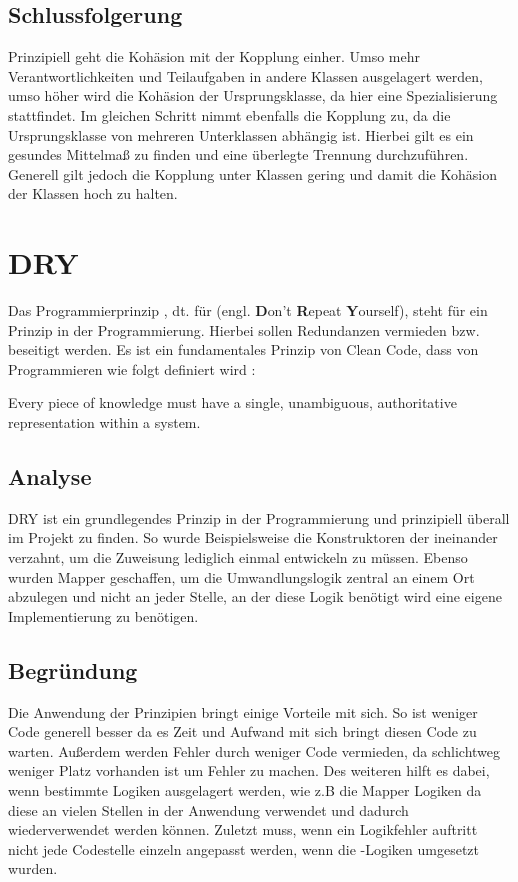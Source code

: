 		\subsection{Schlussfolgerung}
		Prinzipiell geht die Kohäsion mit der Kopplung einher. Umso mehr Verantwortlichkeiten und Teilaufgaben in andere Klassen ausgelagert werden, umso höher wird die Kohäsion der Ursprungsklasse, da hier eine Spezialisierung stattfindet. Im gleichen Schritt nimmt ebenfalls die Kopplung zu, da die Ursprungsklasse von mehreren Unterklassen abhängig ist. Hierbei gilt es ein gesundes Mittelmaß zu finden und eine überlegte Trennung durchzuführen. Generell gilt jedoch die Kopplung unter Klassen gering und damit die Kohäsion der Klassen hoch zu halten.
		
	\section{DRY}
	Das Programmierprinzip , dt. für  (engl. \textbf{D}on't \textbf{R}epeat \textbf{Y}ourself), steht für ein Prinzip in der Programmierung. Hierbei sollen Redundanzen vermieden bzw. beseitigt werden. Es ist ein fundamentales Prinzip von Clean Code, dass von Programmieren wie folgt definiert wird :
	\par Every piece of knowledge must have a single, unambiguous, authoritative representation within a system. \cite{dry.thevaluable}
	\\
		\subsection{Analyse}
		DRY ist ein grundlegendes Prinzip in der Programmierung und prinzipiell überall im Projekt zu finden. So wurde Beispielsweise die Konstruktoren der  ineinander verzahnt, um die Zuweisung lediglich einmal entwickeln zu müssen. Ebenso wurden Mapper geschaffen, um die Umwandlungslogik zentral an einem Ort abzulegen und nicht an jeder Stelle, an der diese Logik benötigt wird eine eigene Implementierung zu benötigen.
		
		\subsection{Begründung}
		Die Anwendung der  Prinzipien bringt einige Vorteile mit sich. So ist weniger Code generell besser da es Zeit und Aufwand mit sich bringt diesen Code zu warten. Außerdem werden Fehler durch weniger Code vermieden, da schlichtweg weniger Platz vorhanden ist um Fehler zu machen. Des weiteren hilft es dabei, wenn bestimmte Logiken ausgelagert werden, wie z.B die Mapper Logiken da diese an vielen Stellen in der Anwendung verwendet und dadurch wiederverwendet werden können. Zuletzt muss, wenn ein Logikfehler auftritt nicht jede Codestelle einzeln angepasst werden, wenn die -Logiken umgesetzt wurden.